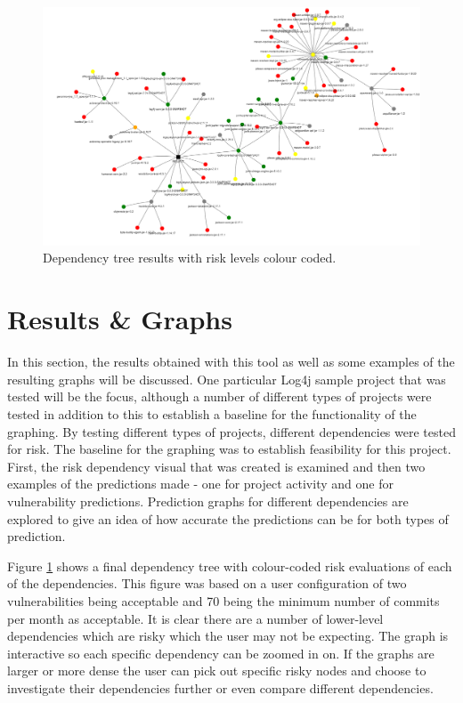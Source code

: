 \documentclass[conference]{IEEEtran}
\begin{document}
{\begin{figure}
    \centering
    \includegraphics[scale=0.5]{dependency.png}
    \caption{Dependency tree results with risk levels colour coded.} 
    \label{fig:tree}
\end{figure}
\section{Results \& Graphs}

In this section, the results obtained with this tool as well as some examples of the resulting graphs will be discussed. One particular Log4j sample project \cite{noauthor_logging-log4j-sampleslog4j-server_nodate} that was tested will be the focus, although a number of different types of projects were tested in addition to this to establish a baseline for the functionality of the graphing. By testing different types of projects, different dependencies were tested for risk. The baseline for the graphing was to establish feasibility for this project. First, the risk dependency visual that was created is examined and then two examples of the predictions made - one for project activity and one for vulnerability predictions. Prediction graphs for different dependencies are explored to give an idea of how accurate the predictions can be for both types of prediction. 

Figure \ref{fig:tree} shows a final dependency tree with colour-coded risk evaluations of each of the dependencies. This figure was based on a user configuration of two vulnerabilities being acceptable and 70 being the minimum number of commits per month as acceptable. It is clear there are a number of lower-level dependencies which are risky which the user may not be expecting. The graph is interactive so each specific dependency can be zoomed in on. If the graphs are larger or more dense the user can pick out specific risky nodes and choose to investigate their dependencies further or even compare different dependencies. 

}
\end{document}

